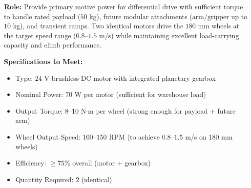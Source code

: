 \documentclass[12pt,a4paper]{article}
\begin{document}
\textbf{Role:} Provide primary motive power for differential drive with sufficient torque to handle rated payload ($50$ kg), future modular attachments (arm/gripper up to $10$ kg), and transient ramps. Two identical motors drive the $180$ mm wheels at the target speed range ($0.8$--$1.5$ m/s) while maintaining excellent load-carrying capacity and climb performance.

\textbf{Specifications to Meet:}
\begin{itemize}
\item Type: $24$ V brushless DC motor with integrated planetary gearbox
\item Nominal Power: $70$ W per motor (sufficient for warehouse load)
\item Output Torque: $8$--$10$ N$\cdot$m per wheel (strong enough for payload + future arm)
\item Wheel Output Speed: $100$--$150$ RPM (to achieve $0.8$--$1.5$ m/s on $180$ mm wheels)

\item Efficiency: $\geq 75\%$ overall (motor + gearbox)
\item Quantity Required: $2$ (identical)
\end{itemize}
\end{document}
